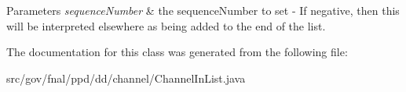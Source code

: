 \begin{DoxyParams}{Parameters}
{\em sequence\-Number} & the sequence\-Number to set -\/ If negative, then this will be interpreted elsewhere as being added to the end of the list. \\
\hline
\end{DoxyParams}


The documentation for this class was generated from the following file\-:\begin{DoxyCompactItemize}
\item 
src/gov/fnal/ppd/dd/channel/Channel\-In\-List.\-java\end{DoxyCompactItemize}
